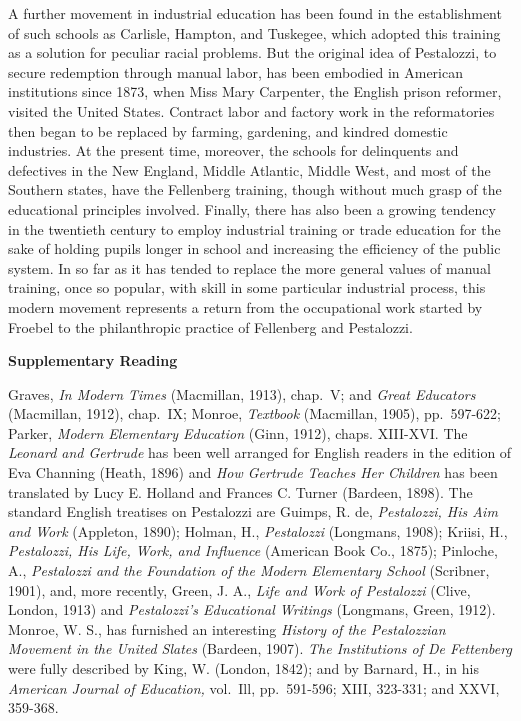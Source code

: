 \documentclass[
]{book}
\begin{document}
A further movement in industrial education has been found in the establishment of such schools as Carlisle, Hampton, and Tuskegee, which adopted this training as a solution for peculiar racial problems. But the original idea of Pestalozzi, to secure redemption through manual labor, has been embodied in American institutions since 1873, when Miss Mary Carpenter, the English prison reformer, visited the United States. Contract labor and factory work in the reformatories then began to be replaced by farming, gardening, and kindred domestic industries. At the present time, moreover, the schools for delinquents and defectives in the New England, Middle Atlantic, Middle West, and most of the Southern states, have the Fellenberg training, though without much grasp of the educational principles involved. Finally, there has also been a growing tendency in the twentieth century to employ industrial training or trade education for the sake of holding pupils longer in school and increasing the efficiency of the public system. In so far as it has tended to replace the more general values of manual training, once so popular, with skill in some particular industrial process, this modern movement represents a return from the occupational work started by Froebel to the philanthropic practice of Fellenberg and Pestalozzi.

\textbf{Supplementary Reading}

Graves, \emph{In Modern Times} (Macmillan, 1913), chap.~V; and \emph{Great Educators} (Macmillan, 1912), chap.~IX; Monroe, \emph{Textbook} (Macmillan, 1905), pp.~597-622; Parker, \emph{Modern Elementary Education} (Ginn, 1912), chaps. XIII-XVI. The \emph{Leonard and Gertrude} has been well arranged for English readers in the edition of Eva Channing (Heath, 1896) and \emph{How Gertrude Teaches Her Children} has been translated by Lucy E. Holland and Frances C. Turner (Bardeen, 1898). The standard English treatises on Pestalozzi are Guimps, R. de, \emph{Pestalozzi, His Aim and Work} (Appleton, 1890); Holman, H., \emph{Pestalozzi} (Longmans, 1908); Kriisi, H., \emph{Pestalozzi, His Life, Work, and Influence} (American Book Co., 1875); Pinloche, A., \emph{Pestalozzi and the Foundation of the Modern Elementary School} (Scribner, 1901), and, more recently, Green, J. A., \emph{Life and Work of Pestalozzi} (Clive, London, 1913) and \emph{Pestalozzi's Educational Writings} (Longmans, Green, 1912). Monroe, W. S., has furnished an interesting \emph{History of the Pestalozzian Movement in the United Slates} (Bardeen, 1907). \emph{The Institutions of De Fettenberg} were fully described by King, W. (London, 1842); and by Barnard, H., in his \emph{American Journal of Education,} vol.~Ill, pp.~591-596; XIII, 323-331; and XXVI, 359-368.
\end{document}
